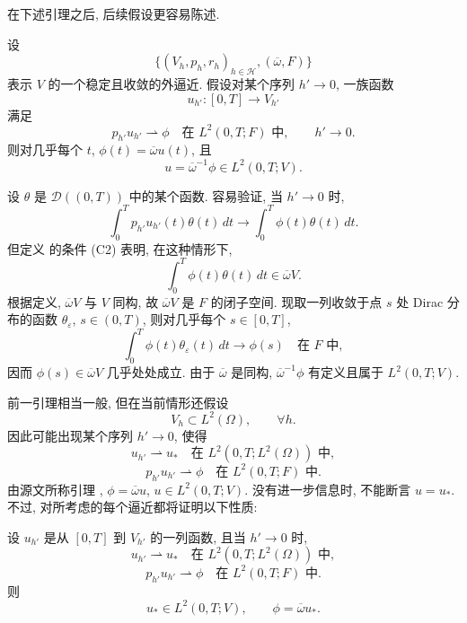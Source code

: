 在下述引理之后, 后续假设更容易陈述.

\begin{Lemma}
\label{lem:ch3-external-approximation-limit}
设
\[
\{(V_h,p_h,r_h)_{h\in\mathcal H},(\overline\omega,F)\}
\]
表示 $V$ 的一个稳定且收敛的外逼近. 假设对某个序列 $h'\to0$, 一族函数
\[
u_{h'}:[0,T]\longrightarrow V_{h'}
\]
满足
\begin{equation}
p_{h'}u_{h'}\rightharpoonup\phi
\quad\text{在 }L^2(0,T;F)\text{ 中},
\qquad h'\to0.
\label{eq:ch3-external-approximation-weak-limit}
\end{equation}
则对几乎每个 $t$, $\phi(t)=\overline\omega u(t)$, 且
\begin{equation}
u=\overline\omega^{-1}\phi\in L^2(0,T;V).
\label{eq:ch3-external-approximation-limit-space}
\end{equation}
\end{Lemma}

\hypertarget{chapter-03-page-254}{}
\begin{Proof}
设 $\theta$ 是 $\mathcal D((0,T))$ 中的某个函数. 容易验证, 当 $h'\to0$ 时,
\[
\int_0^Tp_{h'}u_{h'}(t)\theta(t)\,dt
\longrightarrow\int_0^T\phi(t)\theta(t)\,dt.
\]
但定义  的条件 (C2) 表明, 在这种情形下,
\[
\int_0^T\phi(t)\theta(t)\,dt\in\overline\omega V.
\]
根据定义, $\overline\omega V$ 与 $V$ 同构, 故 $\overline\omega V$ 是 $F$ 的闭子空间. 现取一列收敛于点 $s$ 处 Dirac 分布的函数 $\theta_\varepsilon$, $s\in(0,T)$, 则对几乎每个 $s\in[0,T]$,
\[
\int_0^T\phi(t)\theta_\varepsilon(t)\,dt\longrightarrow\phi(s)
\quad\text{在 }F\text{ 中},
\]
因而 $\phi(s)\in\overline\omega V$ 几乎处处成立. 由于 $\overline\omega$ 是同构, $\overline\omega^{-1}\phi$ 有定义且属于 $L^2(0,T;V)$.
\end{Proof}

前一引理相当一般, 但在当前情形还假设
\begin{equation}
V_h\subset L^2(\Omega),
\qquad\forall h.
\label{eq:ch3-convergence-vh-l2-inclusion}
\end{equation}
因此可能出现某个序列 $h'\to0$, 使得
\[
u_{h'}\rightharpoonup u_*
\quad\text{在 }L^2(0,T;L^2(\Omega))\text{ 中},
\]
\[
p_{h'}u_{h'}\rightharpoonup\phi
\quad\text{在 }L^2(0,T;F)\text{ 中}.
\]
由源文所称引理 , $\phi=\overline\omega u$, $u\in L^2(0,T;V)$. 没有进一步信息时, 不能断言 $u=u_*$. 不过, 对所考虑的每个逼近都将证明以下性质:

设 $u_{h'}$ 是从 $[0,T]$ 到 $V_{h'}$ 的一列函数, 且当 $h'\to0$ 时,
\[
u_{h'}\rightharpoonup u_*
\quad\text{在 }L^2(0,T;L^2(\Omega))\text{ 中},
\]
\[
p_{h'}u_{h'}\rightharpoonup\phi
\quad\text{在 }L^2(0,T;F)\text{ 中}.
\]
则
\begin{equation}
u_*\in L^2(0,T;V),
\qquad\phi=\overline\omega u_*.
\label{eq:ch3-convergence-identification-property}
\end{equation}


